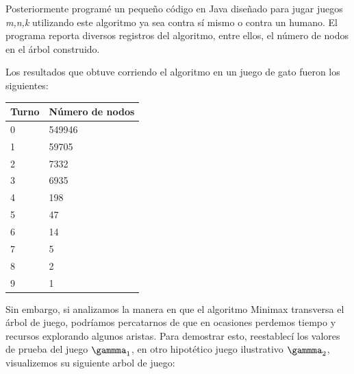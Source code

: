 Posteriormente programé un pequeño código en Java diseñado para jugar juegos \emph{m,n,k} utilizando este algoritmo ya sea contra sí mismo o contra un humano. El programa reporta diversos registros del algoritmo, entre ellos, el número de nodos en el árbol construido. 

Los resultados que obtuve corriendo el algoritmo en un juego de gato fueron los siguientes:


\begin{center}
\begin{tabular}{ | l | l | } 
\hline
Turno & Número de nodos  \\ 
\hline
0 & 549946 \\ 
\hline
1 & 59705 \\ 
\hline
2 & 7332 \\ 
\hline
3  & 6935 \\ 
\hline
4 & 198 \\ 
\hline
5 & 47 \\ 
\hline
6 & 14 \\ 
\hline
7 & 5 \\ 
\hline
8 & 2 \\ 
\hline
9 & 1 \\ 
\hline
\end{tabular}
\end{center}

Sin embargo, si analizamos la manera en que el algoritmo Minimax transversa el árbol de juego, podríamos percatarnos de que en ocasiones perdemos tiempo y recursos explorando algunos aristas. Para demostrar esto, reestablecí los valores de prueba del juego $\gammma_{1}$, en otro hipotético juego ilustrativo $\gammma_{2}$, visualizemos su siguiente arbol de juego: 


